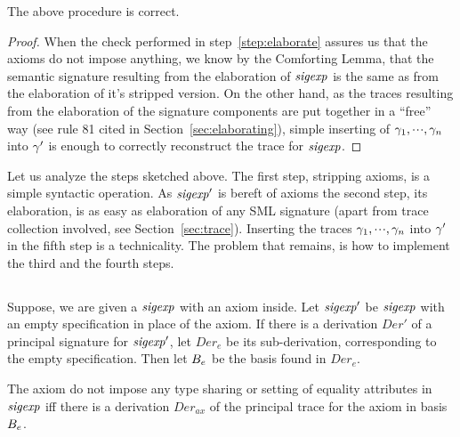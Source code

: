 \begin{thm}
The above procedure is correct.
\end{thm}

\begin{proof}
When the check performed in step~\ref{step:elaborate} assures us that the axioms do not impose anything,
we know by the Comforting Lemma, that the semantic signature
resulting from the elaboration of ${\it sigexp}$ is the same as 
from the elaboration of it's stripped version.
On the other hand, as the traces resulting from the elaboration of the signature components
are put together in a ``free'' way (see rule 81 cited in Section~\ref{sec:elaborating}),
simple inserting of $\gamma_1,\mbox{$\cdot\!\cdot\!\cdot$},\gamma_n$ into $\gamma'$ is enough 
to correctly reconstruct the trace for ${\it sigexp}$.
\end{proof}

Let us analyze the steps sketched above. 
The first step, stripping axioms, is a simple syntactic operation.
As ${\it sigexp}'$ is bereft of axioms the second step, its elaboration, is as easy as elaboration
of any SML signature (apart from trace collection involved, see Section~\ref{sec:trace}).
Inserting the traces $\gamma_1,\mbox{$\cdot\!\cdot\!\cdot$},\gamma_n$ into $\gamma'$ in the fifth step is a technicality.
The problem that remains, is how to implement the third and the fourth steps.

\subsection{\secvalidating}
\label{sec:validating}

Suppose, we are given a ${\it sigexp}$ with an axiom inside. 
Let ${\it sigexp}'$ be ${\it sigexp}$ with an empty specification in place of the axiom.
If there is a derivation $Der'$ of a principal signature for ${\it sigexp}'$,
let $Der_e$ be its sub-derivation, corresponding to the empty specification.
Then let $B_e$ be the basis found in $Der_e$.

\begin{thm}
The axiom do not impose any type sharing or setting of equality attributes in ${\it sigexp}$ 
iff there is a derivation $Der_{ax}$ of the principal trace for the axiom in basis $B_e$. 
\end{thm}

